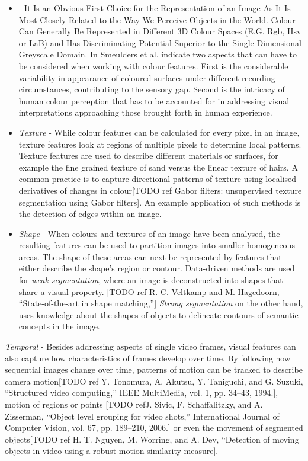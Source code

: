 \begin{itemize}
  \item {} - It Is an Obvious First Choice for the Representation of an Image As It Is Most Closely Related to the Way We Perceive Objects in the World. Colour Can Generally Be Represented in Different 3D Colour Spaces (E.G. Rgb, Hsv or L\*a\*B) and Has Discriminating Potential Superior to the Single Dimensional Greyscale Domain. In \cite{Smeulders:2000tx} Smeulders et al. indicate two aspects that can have to be considered when working with colour features. First is the considerable variability in appearance of coloured surfaces under different recording circumstances, contributing to the sensory gap. Second is the intricacy of human colour perception that has to be accounted for in addressing visual interpretations approaching those brought forth in human experience.
  \item \emph{Texture} - While colour features can be calculated for every pixel in an image, texture features look at regions of multiple pixels to determine local patterns. Texture features are used to describe different materials or surfaces, for example the fine grained texture of sand versus the linear texture of hairs. A common practice is to capture directional patterns of texture using localised derivatives of changes in colour[TODO ref Gabor filters:  unsupervised texture segmentation using Gabor filters]. An example application of such methods is the detection of edges within an image.

  \item \emph{Shape} - When colours and textures of an image have been analysed, the resulting features can be used to partition images into smaller homogeneous areas. The shape of these areas can next be represented by features that either describe the shape's region or contour. Data-driven methods are used for \emph{weak segmentation}, where an image is deconstructed into shapes that share a visual property. [TODO ref R. C. Veltkamp and M. Hagedoorn, “State-of-the-art in shape matching,”] \emph{Strong segmentation} on the other hand, uses knowledge about the shapes of objects to delineate contours of semantic concepts in the image.
\end{itemize}

\item \emph{Temporal} - Besides addressing aspects of single video frames, visual features can also capture how characteristics of frames develop over time. By following how sequential images change over time, patterns of motion can be tracked to describe camera motion[TODO ref Y. Tonomura, A. Akutsu, Y. Taniguchi, and G. Suzuki, “Structured video computing,” IEEE MultiMedia, vol. 1, pp. 34–43, 1994.], motion of regions or points [TODO refJ. Sivic, F. Schaffalitzky, and A. Zisserman, “Object level grouping for video shots,” International Journal of Computer Vision, vol. 67, pp. 189–210, 2006.] or even the movement of segmented objects[TODO ref H. T. Nguyen, M. Worring, and A. Dev, “Detection of moving objects in video using a robust motion similarity measure].

